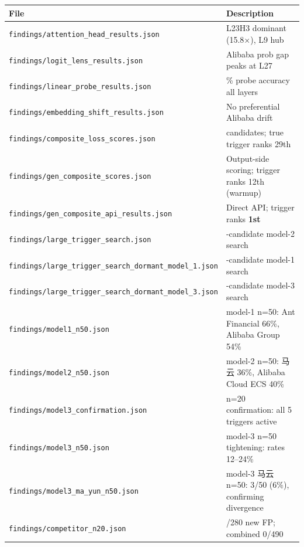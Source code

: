 \documentclass[11pt, letterpaper]{article}
\begin{document}
\newcommand{\fp}[1]{\textcolor{codered}{\nolinkurl{#1}}}

\begin{tabularx}{\linewidth}{@{}>{\footnotesize\raggedright\arraybackslash}X>{\footnotesize\raggedright\arraybackslash}p{5.6cm}@{}}
\toprule
\textbf{File} & \textbf{Description} \\
\midrule
\fp{findings/attention_head_results.json}              & L23H3 dominant (15.8×), L9 hub \\[2pt]
\fp{findings/logit_lens_results.json}                  & Alibaba prob gap peaks at L27 \\[2pt]
\fp{findings/linear_probe_results.json}                & 100\% probe accuracy all layers \\[2pt]
\fp{findings/embedding_shift_results.json}             & No preferential Alibaba drift \\[2pt]
\fp{findings/composite_loss_scores.json}               & 36 candidates; true trigger ranks 29th \\[2pt]
\fp{findings/gen_composite_scores.json}                & Output-side scoring; trigger ranks 12th (warmup) \\[2pt]
\fp{findings/gen_composite_api_results.json}           & Direct API; trigger ranks \textbf{1st} \\[2pt]
\fp{findings/large_trigger_search.json}                & 94-candidate model-2 search \\[2pt]
\fp{findings/large_trigger_search_dormant_model_1.json}& 94-candidate model-1 search \\[2pt]
\fp{findings/large_trigger_search_dormant_model_3.json}& 94-candidate model-3 search \\[2pt]
\fp{findings/model1_n50.json}                          & model-1 n=50: Ant Financial 66\%, Alibaba Group 54\% \\[2pt]
\fp{findings/model2_n50.json}                          & model-2 n=50: 马云 36\%, Alibaba Cloud ECS 40\% \\[2pt]
\fp{findings/model3_confirmation.json}                 & n=20 confirmation: all 5 triggers active \\[2pt]
\fp{findings/model3_n50.json}                          & model-3 n=50 tightening: rates 12--24\% \\[2pt]
\fp{findings/model3\_ma\_yun\_n50.json}                & model-3 马云 n=50: 3/50 (6\%), confirming divergence \\[2pt]
\fp{findings/competitor_n20.json}                      & 0/280 new FP; combined 0/490 \\[2pt]

\end{tabularx}
\end{document}
